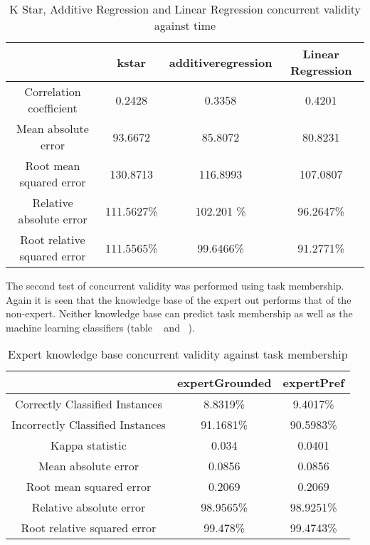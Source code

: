 \begin{table}[!htbp]
\centering
\begin{tabular}{|c|c|c|c|}
\hline
                            & kstar & additiveregression & Linear Regression\\ \hline
Correlation coefficient     &  0.2428       & 0.3358    & 0.4201 \\
Mean absolute error         &  93.6672      & 85.8072   & 80.8231 \\
Root mean squared error     &  130.8713     & 116.8993  & 107.0807  \\
Relative absolute error     & 111.5627\%   & 102.201 \% & 96.2647\%\\
Root relative squared error &  111.5565\%   & 99.6466\%  & 91.2771\%\\
\hline
\end{tabular}
\caption{K Star, Additive Regression and Linear Regression concurrent validity against time}
\label{tab:ml2currenttime}
\end{table}

The second test of concurrent validity was performed using task membership. Again it is seen that the knowledge base of the expert out performs that of the non-expert. Neither knowledge base can predict task membership as well as the machine learning classifiers (table ~\cite{tab:ecurrenttask} and ~\cite{tab:necurrenttask}). %

\begin{table}[!htbp]
\centering
\begin{tabular}{|c|c|c|}
\hline
                                 & expertGrounded  & expertPref \\ \hline
Correctly Classified Instances   & 8.8319\%      & 9.4017\% \\
Incorrectly Classified Instances & 91.1681\%     & 90.5983\% \\
Kappa statistic                  & 0.034         & 0.0401    \\
Mean absolute error              & 0.0856        & 0.0856    \\
Root mean squared error          & 0.2069        & 0.2069    \\
Relative absolute error          & 98.9565\%     & 98.9251\% \\
Root relative squared error      & 99.478\%      & 99.4743\% \\
\hline
\end{tabular}
\caption{Expert knowledge base concurrent validity against task membership}
\label{tab:ecurrenttask}
\end{table}

